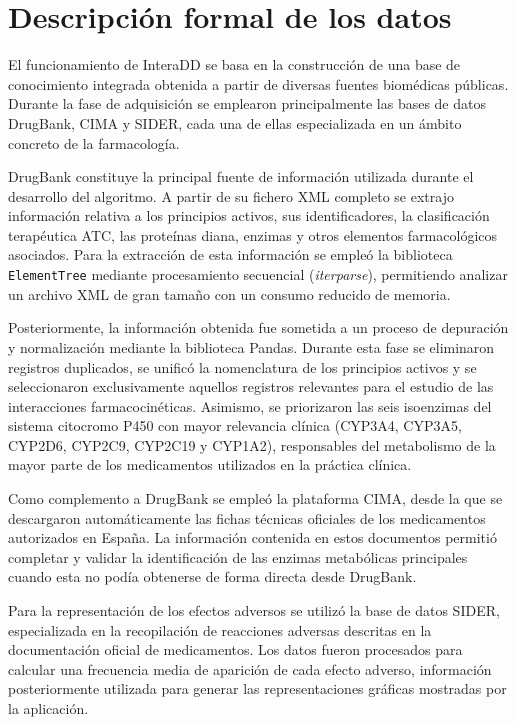 
\section{Descripción formal de los datos}

El funcionamiento de InteraDD se basa en la construcción de una base de conocimiento integrada obtenida a partir de diversas fuentes biomédicas públicas. Durante la fase de adquisición se emplearon principalmente las bases de datos DrugBank, CIMA y SIDER, cada una de ellas especializada en un ámbito concreto de la farmacología.

DrugBank constituye la principal fuente de información utilizada durante el desarrollo del algoritmo. A partir de su fichero XML completo se extrajo información relativa a los principios activos, sus identificadores, la clasificación terapéutica ATC, las proteínas diana, enzimas y otros elementos farmacológicos asociados. Para la extracción de esta información se empleó la biblioteca \texttt{ElementTree} mediante procesamiento secuencial (\textit{iterparse}), permitiendo analizar un archivo XML de gran tamaño con un consumo reducido de memoria.

Posteriormente, la información obtenida fue sometida a un proceso de depuración y normalización mediante la biblioteca Pandas. Durante esta fase se eliminaron registros duplicados, se unificó la nomenclatura de los principios activos y se seleccionaron exclusivamente aquellos registros relevantes para el estudio de las interacciones farmacocinéticas. Asimismo, se priorizaron las seis isoenzimas del sistema citocromo P450 con mayor relevancia clínica (CYP3A4, CYP3A5, CYP2D6, CYP2C9, CYP2C19 y CYP1A2), responsables del metabolismo de la mayor parte de los medicamentos utilizados en la práctica clínica.

Como complemento a DrugBank se empleó la plataforma CIMA, desde la que se descargaron automáticamente las fichas técnicas oficiales de los medicamentos autorizados en España. La información contenida en estos documentos permitió completar y validar la identificación de las enzimas metabólicas principales cuando esta no podía obtenerse de forma directa desde DrugBank.

Para la representación de los efectos adversos se utilizó la base de datos SIDER, especializada en la recopilación de reacciones adversas descritas en la documentación oficial de medicamentos. Los datos fueron procesados para calcular una frecuencia media de aparición de cada efecto adverso, información posteriormente utilizada para generar las representaciones gráficas mostradas por la aplicación.

